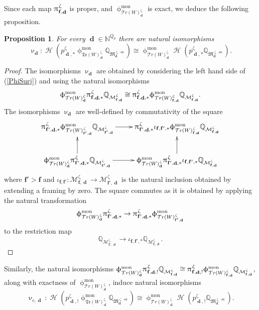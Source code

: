 \documentclass[a4paper,10pt]{amsart}
\renewcommand{\zeta}{\upzeta}
\renewcommand{\pi}{\uppi\hspace{0.05em}}
\renewcommand{\phi}{\upphi}
\renewcommand{\nu}{\upnu}
\newtheorem{proposition}[theorem]{Proposition}
\newcommand{\ff}{\mathbf{f}}
\newcommand{\WW}{\mathcal{T}r(W)}
\newcommand{\WWW}{\mathfrak{Tr}(W)}
\newcommand{\Mst}{\mathfrak{M}}
\newcommand{\Msp}{\mathcal{M}}
\newcommand{\phim}[1]{\phi^{\mon}_{#1}}
\DeclareMathOperator{\sst}{-ss}
\DeclareMathOperator{\mon}{mon}
\DeclareMathOperator{\dd}{\mathbf{d}}
\DeclareMathOperator{\Ho}{\mathcal{H}}
\begin{document}
Since each map $\pi ^{\zeta}_{\ff,\dd }$ is proper, and $\phim{\WW^{\zeta}_{\dd}}$ is exact, we deduce the following proposition.
\begin{proposition}
\label{cvs}
For every $\dd\in\mathbb{N}^{Q_0}$ there are natural isomorphisms
\begin{equation}
\label{nudef}
\nu_{\dd}\colon \Ho(p^{\zeta}_{\dd,*}\phim{\WWW^{\zeta}_{\dd}}\mathbb{Q}_{\Mst_{\dd}^{\zeta\sst}})\cong \phim{\WW^{\zeta}_{\dd}}\Ho(p^{\zeta}_{\dd,*}\mathbb{Q}_{\Mst_{\dd}^{\zeta\sst}}).
\end{equation}
\end{proposition}
\begin{proof}
The isomorphisms $\nu_{\dd}$ are obtained by considering the left hand side of (\ref{PhiSurj}) and using the natural isomorphisms 
\[
 \phim{\WW^{\zeta}_{\dd}}\pi ^{\zeta}_{\ff,\dd ,*}\mathbb{Q}_{\Msp_{\ff,\dd }^{\zeta}}\cong \pi^{\zeta}_{\ff,\dd ,*}\phim{\WW^{\zeta}_{\ff,\dd }}\mathbb{Q}_{\Msp_{\ff,\dd }^{\zeta}}.
\]
The isomorphisms $\nu_{\dd}$ are well-defined by commutativity of the square
\[
\xymatrix{
\pi ^{\zeta}_{\ff',\dd,*}\phim{\WW^{\zeta}_{\ff',\dd}}\mathbb{Q}_{\Msp_{\ff',\dd}^{\zeta}}\ar[r]&\pi ^{\zeta}_{\ff',\dd,*}\iota_{\ff,\ff',*}\phim{\WW^{\zeta}_{\ff,\dd }}\mathbb{Q}_{\Msp_{\ff,\dd }^{\zeta}}\\
\phim{\WW^{\zeta}_{\dd}}\pi ^{\zeta}_{\ff',\dd,*}\mathbb{Q}_{\Msp_{\ff',\dd}^{\zeta}}\ar[u]\ar[r]& \phim{\WW^{\zeta}_{\dd}}\pi ^{\zeta}_{\ff',\dd,*}\iota_{\ff,\ff',*}\mathbb{Q}_{\Msp_{\ff,\dd }^{\zeta}}\ar[u]
}
\]
where $\ff'>\ff$ and $\iota_{\ff,\ff'}\colon\Msp^{\zeta}_{\ff,\dd }\rightarrow \Msp^{\zeta}_{\ff',\dd}$ is the natural inclusion obtained by extending a framing by zero.  The square commutes as it is obtained by applying the natural transformation 
\[
\phim{\WW_{\dd}^{\zeta}}\pi ^{\zeta}_{\ff',\dd,*}\rightarrow \pi ^{\zeta}_{\ff',\dd,*}\phim{\WW^{\zeta}_{\ff',\dd}}
\]
to the restriction map
\[
\mathbb{Q}_{\Msp_{\ff',\dd}^{\zeta}}\rightarrow \iota_{\ff,\ff',*}\mathbb{Q}_{\Msp_{\ff,\dd }^{\zeta}}.
\]
\end{proof}
Similarly, the natural isomorphisms $ \phim{\WW^{\zeta}_{\dd}}\pi ^{\zeta}_{\ff,\dd ,!}\mathbb{Q}_{\Msp_{\ff,\dd }^{\zeta}}\cong \pi ^{\zeta}_{\ff,\dd ,!}\phim{\WW^{\zeta}_{\ff,\dd }}\mathbb{Q}_{\Msp_{\ff,\dd }^{\zeta}}$, along with exactness of $\phim{\WW^{\zeta}_{\dd}}$, induce natural isomorphisms 
\begin{equation}
\nu_{c,\dd}\colon \Ho(p^{\zeta}_{\dd,!}\phim{\WWW^{\zeta}_{\dd}}\mathbb{Q}_{\Mst_{\dd}^{\zeta\sst}})\cong\phim{\WW^{\zeta}_{\dd}}\Ho(p_{\dd,!}^{\zeta}\mathbb{Q}_{\Mst_{\dd}^{\zeta\sst}}).
\end{equation}
\end{document}
